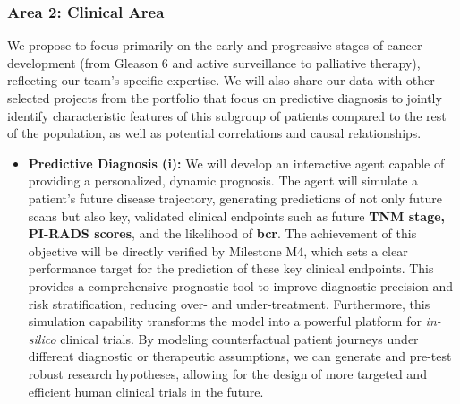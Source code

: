 \documentclass[11pt, a4paper]{article}
\begin{document}
\subsubsection*{Area 2: Clinical Area}
We propose to focus primarily on the early and progressive stages of cancer development (from Gleason 6 and active surveillance to palliative therapy), reflecting our team’s specific expertise. We will also share our data with other selected projects from the portfolio that focus on predictive diagnosis to jointly identify characteristic features of this subgroup of patients compared to the rest of the population, as well as potential correlations and causal relationships. 
\begin{itemize}
    \item \textbf{Predictive Diagnosis  (i):} We will develop an interactive agent capable of providing a personalized, dynamic prognosis. The agent will simulate a patient's future disease trajectory, generating predictions of not only future scans but also key, validated clinical endpoints such as future \textbf{TNM stage, PI-RADS scores}, and the likelihood of \textbf{\gls{bcr}}. The achievement of this objective will be directly verified by Milestone M4, which sets a clear performance target for the prediction of these key clinical endpoints. This provides a comprehensive prognostic tool to improve diagnostic precision and risk stratification, reducing over- and under-treatment. Furthermore, this simulation capability transforms the model into a powerful platform for \textit{in-silico} clinical trials. By modeling counterfactual patient journeys under different diagnostic or therapeutic assumptions, we can generate and pre-test robust research hypotheses, allowing for the design of more targeted and efficient human clinical trials in the future.


\end{itemize}
\end{document}
